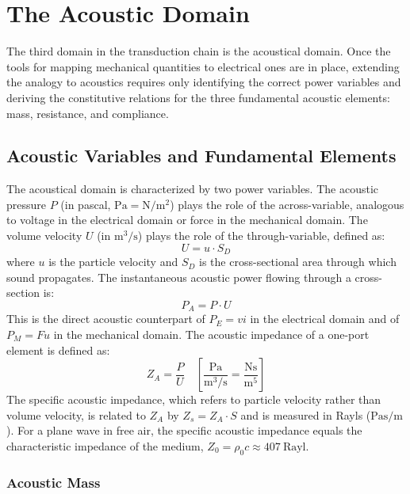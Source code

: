 
\graphicspath{{00_Images/03_chapter/}}

\chapter{The Acoustic Domain}
\label{ch:acoustical_twoport}

The third domain in the transduction chain is the acoustical domain. Once the tools for mapping mechanical quantities to electrical ones are in place, extending the analogy to acoustics requires only identifying the correct power variables and deriving the constitutive relations for the three fundamental acoustic elements: mass, resistance, and compliance.

\section{Acoustic Variables and Fundamental Elements}
\label{sc:31}

The acoustical domain is characterized by two power variables. The acoustic pressure \(P\) (in pascal, \(\si{\pascal} = \si{\newton\per\meter\squared}\)) plays the role of the across-variable, analogous to voltage in the electrical domain or force in the mechanical domain. The volume velocity \(U\) (in \(\si{\cubic\meter\per\second}\)) plays the role of the through-variable, defined as:
\[
U = u \cdot S_D
\]
where \(u\) is the particle velocity and \(S_D\) is the cross-sectional area through which sound propagates. The instantaneous acoustic power flowing through a cross-section is:
\[
P_A = P \cdot U
\]
This is the direct acoustic counterpart of \(P_E = vi\) in the electrical domain and of \(P_M = Fu\) in the mechanical domain. The acoustic impedance of a one-port element is defined as:
\[
Z_A = \frac{P}{U}
\quad\left[\frac{\si{\pascal}}{\si{\cubic\meter\per\second}}
= \frac{\si{\newton\second}}{\si{\meter\tothe{5}}}\right]
\]
The specific acoustic impedance, which refers to particle velocity rather than volume velocity, is related to \(Z_A\) by \(Z_s = Z_A \cdot S\) and is measured in Rayls (\(\si{\pascal\second\per\meter}\)). For a plane wave in free air, the specific acoustic impedance equals the characteristic impedance of the medium, \(Z_0 = \rho_0 c \approx \SI{407}{\text{Rayl}}\).

\subsection{Acoustic Mass}
\label{ssc:311}

